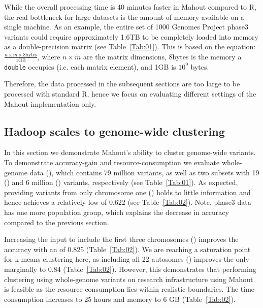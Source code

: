 \documentclass{bioinfo}
\begin{document}
While the overall processing time is 40 minutes faster in Mahout compared to R, the real bottleneck for large datasets is the amount of memory available on a single machine. 
As an example, the entire set of 1000 Genomes Project phase3 variants could require approximately 1.6TB to be completely loaded into memory as a double-precision matrix (see Table~\ref{Tab:01}). This is based on the equation:
$\frac{n \times m \times 8\text{bytes}}{1\text{GB}}$, where $n \times m$ are the matrix dimensions, 8bytes is the memory a \texttt{double} occupies (i.e. each matrix element), and  1GB is $10^9$ bytes.

Therefore, the data processed in the subsequent sections are too large to be processed with standard R, hence we focus on evaluating different settings of the Mahout implementation only.  



\subsection*{Hadoop scales to genome-wide clustering}
In this section we demonstrate Mahout's ability to cluster genome-wide variants. 
To demonstrate accuracy-gain and resource-consumption we evaluate whole-genome data (\FullPhasethree{}), which contains 79 million variants, as well as two subsets with 19 (\ThreePhasethree{}) and 6 million (\OnePhasethree{}) variants, respectively  (see Table~\ref{Tab:01}).  
As expected, providing variants from only chromosome one (\OnePhasethree{}) holds to little information and hence achieves a relatively low \ARI{} of 0.622 (see Table~\ref{Tab:02}).
Note, phase3 data has one more population group, which explains the decrease in accuracy compared to the previous section.  

Increasing the input to include the first three chromosomes (\ThreePhasethree{}) improves the accuracy with an \ARI{} of 0.825 (Table~\ref{Tab:02}).
We are reaching a saturation point for k-means clustering here, as including all 22 autosomes (\FullPhasethree{}) improves the \ARI{} only marginally to 0.84 (Table~\ref{Tab:02}).
However, this demonstrates that performing clustering using whole-genome variants on research infrastructure using Mahout is feasible as the resource consumption lies within realistic boundaries. 
The time consumption increases to 25 hours and memory to 6 GB (Table~\ref{Tab:02}). 


\end{document}
